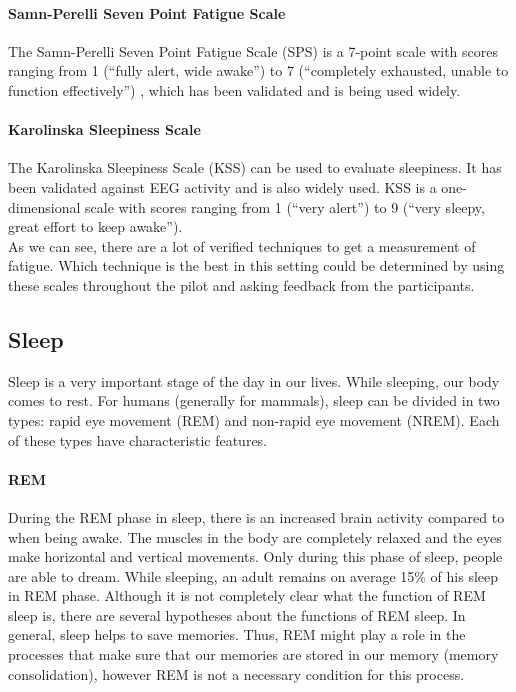 \paragraph{Samn-Perelli Seven Point Fatigue Scale}
The Samn-Perelli Seven Point Fatigue Scale (SPS) is a 7-point scale with scores ranging from 1 (``fully alert, wide awake'') to 7 (``completely exhausted, unable to function effectively'') \cite{samn1982estimating}, which has been validated and is being used widely.

\paragraph{Karolinska Sleepiness Scale}
The Karolinska Sleepiness Scale (KSS) can be used to evaluate sleepiness. 
It has been validated against EEG activity and is also widely used.
KSS is a one-dimensional scale with scores ranging from 1 (``very alert'') to 9 (``very sleepy, great effort to keep awake'').\\

As we can see, there are a lot of verified techniques to get a measurement of fatigue.
Which technique is the best in this setting could be determined by using these scales throughout the pilot and asking feedback from the participants.  


\subsection{Sleep} \label{section:Sleep}
Sleep is a very important stage of the day in our lives. 
While sleeping, our body comes to rest.
For humans (generally for mammals), sleep can be divided in two types: rapid eye movement (REM) and non-rapid eye movement (NREM).
Each of these types have characteristic features.

\paragraph{REM}
During the REM phase in sleep, there is an increased brain activity compared to when being awake.
The muscles in the body are completely relaxed and the eyes make horizontal and vertical movements. Only during this phase of sleep, people are able to dream.
While sleeping, an adult remains on average 15\% of his sleep in REM phase.
Although it is not completely clear what the function of REM sleep is, there are several hypotheses about the functions of REM sleep.
In general, sleep helps to save memories.
Thus, REM might play a role in the processes that make sure that our memories are stored in our memory (memory consolidation), however REM is not a necessary condition for this process.

